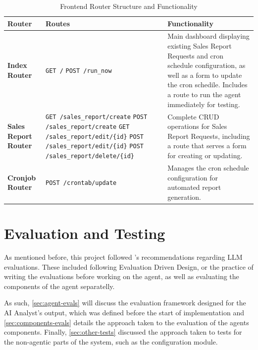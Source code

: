\documentclass[a4paper]{report}
\begin{document}
\begin{table}[H]
\centering
\begin{tabular}{|p{2.5cm}|p{5.5cm}|p{6.5cm}|}
\hline
\textbf{Router} & \textbf{Routes} & \textbf{Functionality} \\ \hline
\textbf{Index Router} & 
\texttt{GET /} \newline \texttt{POST /run\_now} & 
Main dashboard displaying existing Sales Report Requests and cron schedule configuration, as well as a form to update the cron schedile. Includes a route to run the agent immediately for testing. \\ \hline
\textbf{Sales Report Router} & 
\texttt{GET /sales\_report/create} \newline \texttt{POST /sales\_report/create} \newline \texttt{GET /sales\_report/edit/\{id\}} \newline \texttt{POST /sales\_report/edit/\{id\}} \newline \texttt{POST /sales\_report/delete/\{id\}} & 
Complete CRUD operations for Sales Report Requests, including a route that serves a form for creating or updating. \\ \hline

\textbf{Cronjob Router} & 
\texttt{POST /crontab/update} & 
Manages the cron schedule configuration for automated report generation. \\ \hline
\end{tabular}
\caption{Frontend Router Structure and Functionality}
\label{tab:frontend-routes}
\end{table}

\chapter{Evaluation and Testing}
\label{chapter:evaluation-testing}

As mentioned before, this project followed \cite{aiebook2025}'s recommendations regarding LLM evaluations. These included following Evaluation Driven Design, or the practice of writing the evaluations before working on the agent, as well as evaluating the components of the agent separatelly.

As such, \autoref{sec:agent-evals} will discuss the evaluation framework designed for the AI Analyst's output, which was defined before the start of implementation and \autoref{sec:components-evals} details the approach taken to the evaluation of the agents components. Finally, \autoref{sec:other-tests} discussed the approach taken to tests for the non-agentic parts of the system, such as the configuration module.
\end{document}
